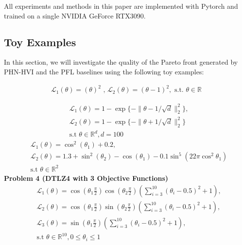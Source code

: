 \documentclass[letterpaper]{article} %
\newcommand{\ourmodel}{PHN-HVI }
\begin{document}
All experiments and methods in this paper are implemented with Pytorch \cite{pytorch} and trained on a single NVIDIA GeForce RTX3090.
\subsection{Toy Examples}
\label{sst:toy}
In this section, we will investigate the quality of the Pareto front generated by \ourmodel and the PFL baselines using the following toy examples:


\begin{equation}
  \begin{aligned}
    \mathcal{L}_1(\theta) = (\theta)^2 \text{ , } \mathcal{L}_2(\theta) = (\theta-1)^2, \text{ s.t. }\theta \in \mathbb{R}
\end{aligned}
\end{equation}


\begin{equation}
\begin{aligned}
    & \mathcal{L}_1(\theta) = 1 - \exp\{ -\| \theta - 1/\sqrt{d} \|^2_2 \}, \\
    & \mathcal{L}_2(\theta) = 1 - \exp\{ -\| \theta + 1/\sqrt{d} \|^2_2 \} \\
    & \text{s.t }\theta \in \mathbb{R}^d, d=100
\end{aligned}
\label{pb1}
\end{equation}
\begin{align}
    & \mathcal{L}_1(\theta) = \cos^2(\theta_1) + 0.2, \\
    & \mathcal{L}_2(\theta) = 1.3 + \sin^2(\theta_2) - \cos(\theta_1) - 0.1\sin^5(22 \pi \cos^2\theta_1) \nonumber \\
    & \text{s.t }\theta \in \mathbb{R}^2 \nonumber
\end{align}
{\bf Problem 4 (DTLZ4 with 3 Objective Functions)}
\begin{align}
    & \mathcal{L}_1(\theta) = \cos(\theta_1 \frac{\pi}{2})\cos(\theta_2 \frac{\pi}{2})(\sum_{i=3}^{10} (\theta_i -0.5)^2 +1), \\
    & \mathcal{L}_2(\theta) = \cos(\theta_1 \frac{\pi}{2})\sin(\theta_2 \frac{\pi}{2})(\sum_{i=3}^{10} (\theta_i -0.5)^2 +1), \nonumber \\
    & \mathcal{L}_3(\theta) = \sin(\theta_1 \frac{\pi}{2})(\sum_{i=3}^{10} (\theta_i -0.5)^2 +1), \nonumber \\
    & \text{s.t }\theta \in \mathbb{R}^{10}, 0 \leq \theta_i \leq 1 \nonumber
    \label{pb4}
\end{align}
\end{document}

